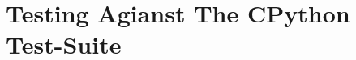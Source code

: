 \documentclass{l4proj}
\begin{document}
\section{Testing Agianst The CPython Test-Suite}





\end{document}
